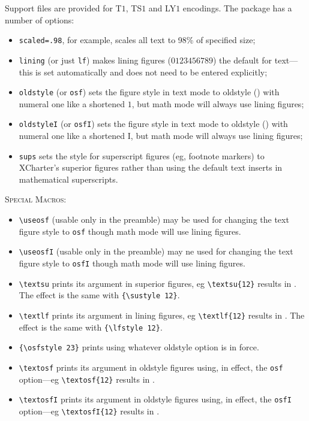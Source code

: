 \documentclass[11pt]{article}
\begin{document}
Support files are provided for T$1$, TS$1$ and LY$1$ encodings. The package has  a number of options:
\begin{itemize}
\item
{\tt scaled=.98}, for example, scales all text to 98\% of specified size;
\item {\tt lining} (or just {\tt lf}) makes lining figures ($0123456789$) the default for text---this is set automatically and does not need to be entered explicitly;
\item {\tt oldstyle} (or {\tt osf}) sets the figure style in text mode to oldstyle () with numeral one like a shortened  $1$, but math mode will always use lining figures;
\item {\tt oldstyleI} (or {\tt osfI}) sets the figure style in text mode to oldstyle () with numeral one like a shortened I, but math mode will always use lining figures;
\item {\tt sups} sets the style for superscript figures (eg, footnote markers) to XCharter's superior figures rather than using the default text inserts in mathematical superscripts.
\end{itemize}
\textsc{Special Macros:}
\begin{itemize}
\item
\verb|\useosf| (usable only in the preamble) may be used for changing the text figure style to {\tt osf} though math mode will use lining figures.
\item \verb|\useosfI| (usable only in the preamble) may ne used for changing the text figure style to {\tt osfI} though math mode will use lining figures.
\item \verb|\textsu| prints its argument in superior figures, eg \verb|\textsu{12}| results in . The effect is the same with \verb|{\sustyle 12}|.
\item \verb|\textlf| prints its argument in lining figures, eg \verb|\textlf{12}| results in . The effect is the same with \verb|{\lfstyle 12}|.
\item \verb|{\osfstyle 23}| prints  using whatever oldstyle option is in force. 
\item \verb|\textosf| prints its argument in oldstyle figures using, in effect, the {\tt osf} option---eg \verb|\textosf{12}| results in . 
\item \verb|\textosfI| prints its argument in oldstyle figures using, in effect, the {\tt osfI} option---eg \verb|\textosfI{12}| results in . \end{itemize}
\end{document}
